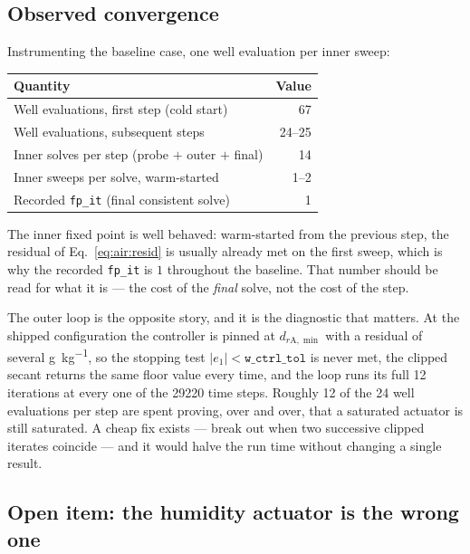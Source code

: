 \subsection{Observed convergence}
\label{sec:air:converge}

Instrumenting the baseline case, one well evaluation per inner sweep:

\begin{center}
\begin{tabular}{@{}lr@{}}
\toprule
Quantity & Value \\
\midrule
Well evaluations, first step (cold start)      & \num{67} \\
Well evaluations, subsequent steps             & \num{24}--\num{25} \\
Inner solves per step (probe $+$ outer $+$ final) & \num{14} \\
Inner sweeps per solve, warm-started           & \num{1}--\num{2} \\
Recorded \texttt{fp\_it} (final consistent solve) & \num{1} \\
\bottomrule
\end{tabular}
\end{center}

The inner fixed point is well behaved: warm-started from the previous step, the
residual of Eq.~\eqref{eq:air:resid} is usually already met on the first sweep,
which is why the recorded \texttt{fp\_it} is $1$ throughout the baseline. That
number should be read for what it is --- the cost of the \emph{final} solve,
not the cost of the step.

The outer loop is the opposite story, and it is the diagnostic that matters. At
the shipped configuration the controller is pinned at $d_{r\mathrm{A},\min}$
with a residual of several \si{\gram\per\kilogram}, so the stopping test
$|e_1|<\texttt{w\_ctrl\_tol}$ is never met, the clipped secant returns the same
floor value every time, and the loop runs its full \num{12} iterations at every
one of the \num{29220} time steps. Roughly \num{12} of the \num{24} well
evaluations per step are spent proving, over and over, that a saturated
actuator is still saturated. A cheap fix exists --- break out when two
successive clipped iterates coincide --- and it would halve the run time
without changing a single result.

\subsection{Open item: the humidity actuator is the wrong one}
\label{sec:air:openitem}

